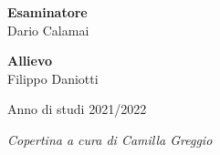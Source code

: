 \documentclass[class=book, crop=false, oneside, a4paper]{standalone}
\begin{document}
\begin{titlepage}
        \Large
        \textbf{Esaminatore}
        \vspace{0.125cm}\\
        \large
        Dario Calamai
        
        \raggedleft
        
        \Large
        \textbf{Allievo}
        \vspace{0.125cm}\\
        \large
        Filippo Daniotti
        
        
        
        \begin{center}
            \vspace{1cm}
            Anno di studi 2021/2022 
        \end{center}
        
    \end{titlepage}
    \clearpage

    \thispagestyle{empty}
    \vspace*{\fill}
    \begin{center}
        \textit{Copertina a cura di Camilla Greggio}
    \end{center}
    \clearpage
\end{document}

